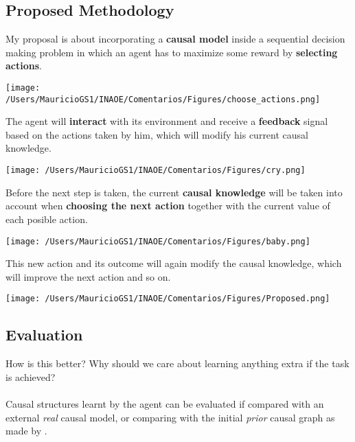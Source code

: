 \documentclass[a0,portrait]{a0poster}
\begin{document}
\begin{multicols}{3}
\subsection*{Proposed Methodology}
My proposal is about incorporating a \textbf{causal model} inside a sequential decision making problem in which an agent has to maximize some reward by \textbf{selecting actions}.\\
\begin{center}
\texttt{[image: /Users/MauricioGS1/INAOE/Comentarios/Figures/choose\_actions.png]}
\end{center}
The agent will \textbf{interact} with its environment and receive a \textbf{feedback} signal based on the actions taken by him, which will modify his current causal knowledge.\\
\begin{center}
\texttt{[image: /Users/MauricioGS1/INAOE/Comentarios/Figures/cry.png]}
\end{center}
Before the next step is taken, the current \textbf{causal knowledge} will be taken into account when \textbf{choosing the next action} together with the current value of each posible action.\\ 
\begin{center}
\texttt{[image: /Users/MauricioGS1/INAOE/Comentarios/Figures/baby.png]}
\end{center}
This new action and its outcome will again modify the causal knowledge, which will improve the next action and so on.
\begin{center}
\texttt{[image: /Users/MauricioGS1/INAOE/Comentarios/Figures/Proposed.png]}
\end{center}
\subsection*{Evaluation}
How is this better? Why should we care about learning anything extra if the task is achieved?\\
\\
Causal structures learnt by the agent can be evaluated if compared with an external \textit{real} causal model, or comparing with the initial \textit{prior} causal graph as made by  \cite{hagmayer2013repeated}.

\end{multicols}
\end{document}
